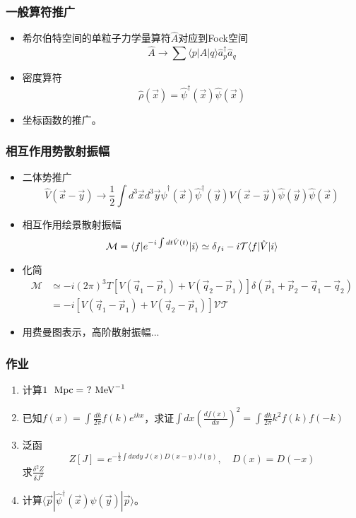 \documentclass[aspectratio=1610,14pt,mathserif]{beamer}
\newcommand{\bch}{}
\newcommand{\ech}{}
\newcommand{\unit}[1]{\ {{\rm \ #1}}}
\newcommand{\mev}{\ {\rm MeV}}
\begin{document}
\begin{frame}
\frametitle{\bch 一般算符推广 \ech}
\bch
\begin{itemize}
\item 希尔伯特空间的单粒子力学量算符$\hat A$对应到Fock空间
$$
\hat A \to \sum \langle p | A | q\rangle \hat a^\dagger_p \hat a_q
$$
\item 密度算符
$$
\hat \rho(\vec x) =\hat \psi^\dagger(\vec x) \hat \psi(\vec x)
$$
\item 坐标函数的推广。
\end{itemize}
\ech
\end{frame}

\begin{frame}
\frametitle{\bch 相互作用势散射振幅 \ech}
\bch
\begin{itemize}
\item 二体势推广
$$
\hat V(\vec x-\vec y)  \to \frac{1}{2} \int d^3 \vec x d^3 \vec y \hat \psi^\dagger(\vec x)\hat \psi^\dagger(\vec y)V(\vec x-\vec y) \hat \psi(\vec y) \hat \psi(\vec x)
$$
\item 相互作用绘景散射振幅
$$
\mathcal{M} = \langle f | e^{-i\int dt \hat V(t)} | i\rangle \simeq \delta_{fi} - i {\cal T} \langle f | \hat V |i \rangle 
$$
\item 化简
\begin{equation*}
\begin{aligned}
\mathcal{M} &\simeq -i(2\pi)^3T [ V(\vec q_1  - \vec p_1) + V(\vec q_2 - \vec p_1)] {\delta(\vec p_1 + \vec p_2 - \vec q_1 - \vec q_2)}\\&= -i [V(\vec q_1  - \vec p_1) + V(\vec q_2 - \vec p_1)] \mathcal{VT}
\end{aligned}
\end{equation*}
\item 用费曼图表示，高阶散射振幅...
\end{itemize}
\ech
\end{frame}

\begin{frame}
\frametitle{\bch 作业 \ech}
\bch
\begin{enumerate}
\item 计算$1\unit{Mpc} =\ ? \mev^{-1}$
\item 已知$f(x) = \int \frac{dk}{2\pi} f(k) e^{ikx}$，求证$\int dx \left(\frac{df(x)}{dx}\right)^2 = \int \frac{dk}{2\pi}k^2 f(k)f(-k)$
\item 泛函$$Z[J] = e^{-\frac{1}{2} \int dx dy\ J(x) D(x-y) J(y)},\quad D(x)=D(-x)$$ 求$\frac{\delta^2 Z}{\delta J^2}$
\item 计算$\langle \vec p | \hat \psi^\dagger(\vec x)\hat \psi(\vec y) | \vec p \rangle$。
\end{enumerate}
\ech
\end{frame}
\end{document}
